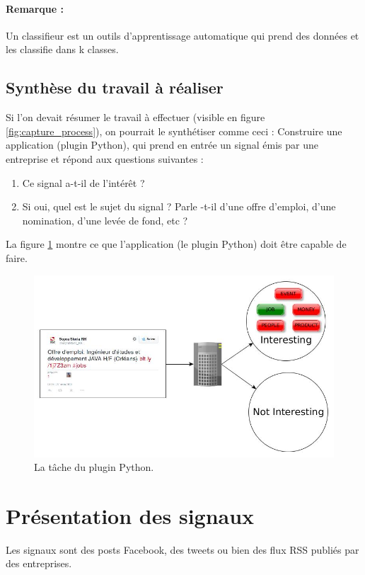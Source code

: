         \paragraph{Remarque :}
            Un classifieur est un outils d'apprentissage automatique qui prend des données et les classifie dans k classes.

    \subsection{Synthèse du travail à réaliser}
        Si l'on devait résumer le travail à effectuer (visible en figure \ref{fig:capture_process}), on pourrait le synthétiser comme ceci : Construire une application (plugin Python), qui prend en entrée un signal émis par une entreprise et répond aux questions suivantes :
        \begin{enumerate}
            \item Ce signal a-t-il de l'intérêt ?
            \item Si oui, quel est le sujet du signal ? Parle -t-il d'une offre d'emploi, d'une nomination, d'une levée de fond, etc ?
        \end{enumerate}
        La figure \ref{fig:process} montre ce que l'application (le plugin Python) doit être capable de faire.

        \begin{figure}[h!]
            \centering
            \includegraphics[width=\textwidth]{images/process.jpg}
            \caption{La tâche du plugin Python.}
            \label{fig:process}
        \end{figure}

\section{Présentation des signaux}
\label{sec:etat_bd}
    Les signaux sont des posts Facebook, des tweets ou bien des flux RSS publiés par des entreprises.

